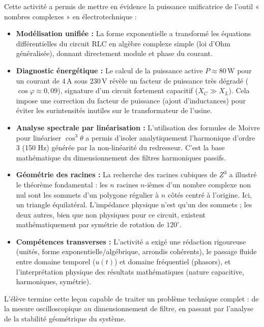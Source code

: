 \documentclass[11pt]{article}
\newcounter{popsec}
\newcounter{popsub}
\newcommand{\courssub}[1]{%
  \stepcounter{popsub}%
  \par\vspace{9pt}\noindent{\popxbold\fontsize{11.5}{13}\selectfont\color{popink}{\color{poporange}\thepopsec.\thepopsub}\hspace{6pt}#1}\par\nopagebreak\vspace{4pt}
}
\begin{document}
\courssub{Bilan et synthèse de la leçon}
\begin{savaistu}
Cette activité a permis de mettre en évidence la puissance unificatrice de l'outil « nombres complexes » en électrotechnique :
\begin{itemize}
    \item \textbf{Modélisation unifiée :} La forme exponentielle a transformé les équations différentielles du circuit RLC en algèbre complexe simple (loi d'Ohm généralisée), donnant directement module et phase du courant.
    \item \textbf{Diagnostic énergétique :} Le calcul de la puissance active $P \approx 80\,\text{W}$ pour un courant de $4\,\text{A}$ sous $230\,\text{V}$ révèle un facteur de puissance très dégradé ($\cos\varphi \approx 0,09$), signature d'un circuit fortement capacitif ($X_C \gg X_L$). Cela impose une correction du facteur de puissance (ajout d'inductances) pour éviter les surintensités inutiles sur le transformateur de l'usine.
    \item \textbf{Analyse spectrale par linéarisation :} L'utilisation des formules de Moivre pour linéariser $\cos^3\theta$ a permis d'isoler analytiquement l'harmonique d'ordre 3 (150 Hz) générée par la non-linéarité du redresseur. C'est la base mathématique du dimensionnement des filtres harmoniques passifs.
    \item \textbf{Géométrie des racines :} La recherche des racines cubiques de $\underline{Z}^3$ a illustré le théorème fondamental : les $n$ racines $n$-ièmes d'un nombre complexe non nul sont les sommets d'un polygone régulier à $n$ côtés centré à l'origine. Ici, un triangle équilatéral. L'impédance physique n'est qu'un des sommets ; les deux autres, bien que non physiques pour ce circuit, existent mathématiquement par symétrie de rotation de $120^\circ$.
    \item \textbf{Compétences transverses :} L'activité a exigé une rédaction rigoureuse (unités, forme exponentielle/algébrique, arrondis cohérents), le passage fluide entre domaine temporel ($u(t)$) et domaine fréquentiel (phasors), et l'interprétation physique des résultats mathématiques (nature capacitive, harmoniques, symétrie).
\end{itemize}
L'élève termine cette leçon capable de traiter un problème technique complet : de la mesure oscilloscopique au dimensionnement de filtre, en passant par l'analyse de la stabilité géométrique du système.
\end{savaistu}
\end{document}
